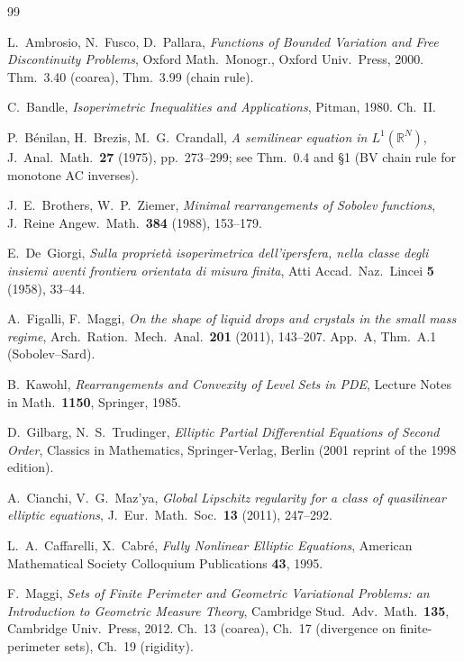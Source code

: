 \documentclass[11pt]{article}
\theoremstyle{definition}
\newcommand{\R}{\mathbb{R}}
\begin{document}
\begin{thebibliography}{99}

 L.~Ambrosio, N.~Fusco, D.~Pallara,
\emph{Functions of Bounded Variation and Free Discontinuity Problems},
Oxford Math.\ Monogr., Oxford Univ.\ Press, 2000. Thm.~3.40 (coarea),
Thm.~3.99 (chain rule).

 C.~Bandle, \emph{Isoperimetric Inequalities and
Applications}, Pitman, 1980. Ch.~II.

 P.~B\'enilan, H.~Brezis, M.~G.~Crandall,
\emph{A semilinear equation in $L^{1}(\R^{N})$}, J.~Anal.\ Math.\
\textbf{27} (1975), pp.~273--299; see Thm.~0.4 and \S1 (BV chain
rule for monotone AC inverses).

 J.~E.~Brothers, W.~P.~Ziemer,
\emph{Minimal rearrangements of Sobolev functions}, J.~Reine
Angew.~Math.\ \textbf{384} (1988), 153--179.

 E.~De~Giorgi,
\emph{Sulla propriet\`a isoperimetrica dell'ipersfera, nella classe degli
insiemi aventi frontiera orientata di misura finita}, Atti Accad.~Naz.\
Lincei \textbf{5} (1958), 33--44.

 A.~Figalli, F.~Maggi,
\emph{On the shape of liquid drops and crystals in the small mass
regime}, Arch.~Ration.\ Mech.\ Anal.\ \textbf{201} (2011),
143--207. App.~A, Thm.~A.1 (Sobolev--Sard).

 B.~Kawohl, \emph{Rearrangements and Convexity of
Level Sets in PDE}, Lecture Notes in Math.\ \textbf{1150}, Springer,
1985.

 D.~Gilbarg, N.~S.~Trudinger,
\emph{Elliptic Partial Differential Equations of Second Order},
Classics in Mathematics, Springer-Verlag, Berlin (2001 reprint of the
1998 edition).

 A.~Cianchi, V.~G.~Maz'ya,
\emph{Global Lipschitz regularity for a class of quasilinear
elliptic equations}, J.~Eur.~Math.~Soc.\ \textbf{13} (2011), 247--292.

\bibitem{CafCab1995} L.~A.~Caffarelli, X.~Cabr\'e,
\emph{Fully Nonlinear Elliptic Equations}, American Mathematical
Society Colloquium Publications \textbf{43}, 1995.

 F.~Maggi, \emph{Sets of Finite Perimeter and
Geometric Variational Problems: an Introduction to Geometric Measure
Theory}, Cambridge Stud.\ Adv.\ Math.\ \textbf{135}, Cambridge Univ.\
Press, 2012. Ch.~13 (coarea), Ch.~17 (divergence on finite-perimeter
sets), Ch.~19 (rigidity).


\end{thebibliography}
\end{document}
